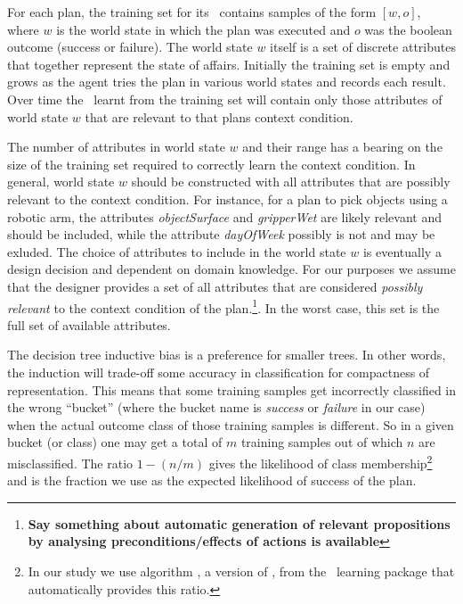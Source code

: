 For each plan, the training set for its \dt\ contains samples of the form $[w,o]$, where $w$ is the world state in which the plan was executed and $o$ was the boolean outcome (success or failure). The world state $w$ itself is a set of discrete attributes that together represent the state of affairs. Initially the training set is empty and grows as the agent tries the plan in various world states and records each result. Over time the \dt\ learnt from the training set will contain only those attributes of world state $w$ that are relevant to that plans context condition.

The number of attributes in world state $w$ and their range has a bearing on the
size of the training set required to correctly learn the context condition. In
general, world state $w$ should be constructed with all attributes that are
possibly relevant to the context condition. For instance, for a plan to pick
objects using a robotic arm, the attributes \textit{objectSurface} and
\textit{gripperWet} are likely relevant and should be included, while the
attribute \textit{dayOfWeek} possibly is not and may be exluded. The choice of
attributes to include in the world state $w$ is eventually a design decision and
dependent on domain knowledge. For our purposes we assume that the designer
provides a set of all attributes that are considered \textit{possibly relevant}
to the context condition of the plan.\footnote{\textbf{Say something about automatic
generation of relevant propositions by analysing preconditions/effects of
actions is available}}. In the worst case, this set is the full set of available
attributes.

The decision tree inductive bias is a preference for smaller trees. In other words, the induction will trade-off some accuracy in classification for compactness of representation. 
This means that some training samples get incorrectly classified in the wrong ``bucket'' (where the bucket name is {\it success} or {\it failure} in our case) when the actual outcome class of those training samples is different. So in a given bucket (or class) one may get a total of $m$ training samples out of which $n$ are misclassified. The ratio $1-(n/m)$ gives the likelihood of class membership\footnote{In our study we use algorithm , a version of  \cite{Mitchell97:ML}, from the \weka\ learning package \cite{weka99} that automatically provides this ratio.} and is the fraction we use as the expected likelihood of success of the plan.


